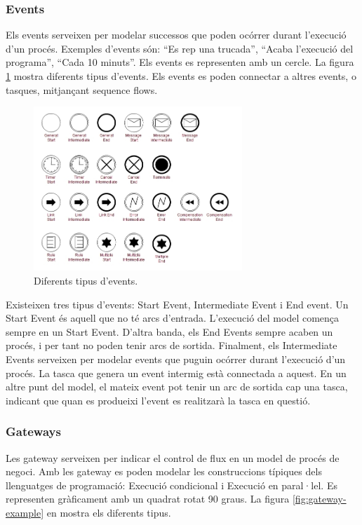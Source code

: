 \subsubsection{Events}

Els events serveixen per modelar successos que poden ocórrer durant l'execució d'un procés. Exemples d'events són: ``Es rep una trucada'', ``Acaba l'execució del programa'', ``Cada 10 minuts''. Els events es representen amb un cercle. La figura \ref{fig:event-example} mostra diferents tipus d'events. Els events es poden connectar a altres events, o tasques, mitjançant sequence flows.

\begin{figure}[!hbt]
    \centering
    \includegraphics[width=0.7\textwidth]{figures/bpmn-events.jpg}
    \caption{Diferents tipus d'events.}
    \label{fig:event-example}
\end{figure}


Existeixen tres tipus d'events: Start Event, Intermediate Event i End event. Un Start Event és aquell que no té arcs d'entrada. L'execució del model comença sempre en un Start Event. D'altra banda, els End Events sempre acaben un procés, i per tant no poden tenir arcs de sortida. Finalment, els Intermediate Events serveixen per modelar events que puguin ocórrer durant l'execució d'un procés. La tasca que genera un event intermig està connectada a aquest. En un altre punt del model, el mateix event pot tenir un arc de sortida cap una tasca, indicant que quan es produeixi l'event es realitzarà la tasca en questió.

\subsubsection{Gateways}

Les gateway serveixen per indicar el control de flux en un model de procés de negoci. Amb les gateway es poden modelar les construccions típiques dels llenguatges de programació: Execució condicional i Execució en paral·lel. Es representen gràficament amb un quadrat rotat 90 graus. La figura \ref{fig:gateway-example} en mostra els diferents tipus.

